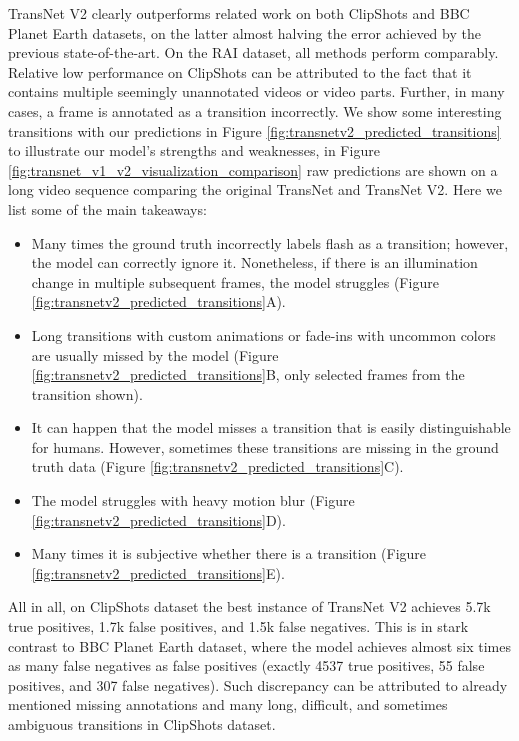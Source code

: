 TransNet V2 clearly outperforms related work on both ClipShots and BBC Planet Earth datasets, on the latter almost halving the error achieved by the previous state-of-the-art. On the RAI dataset, all methods perform comparably. Relative low performance on ClipShots can be attributed to the fact that it contains multiple seemingly unannotated videos or video parts. Further, in many cases, a frame is annotated as a transition incorrectly. We show some interesting transitions with our predictions in Figure \ref{fig:transnetv2_predicted_transitions} to illustrate our model's strengths and weaknesses, in Figure \ref{fig:transnet_v1_v2_visualization_comparison} raw predictions are shown on a long video sequence comparing the original TransNet and TransNet V2. Here we list some of the main takeaways:
\begin{itemize}
    \item Many times the ground truth incorrectly labels flash as a transition; however, the model can correctly ignore it. Nonetheless, if there is an illumination change in multiple subsequent frames, the model struggles (Figure \ref{fig:transnetv2_predicted_transitions}A).
    \item Long transitions with custom animations or fade-ins with uncommon colors are usually missed by the model (Figure \ref{fig:transnetv2_predicted_transitions}B, only selected frames from the transition shown).
    \item It can happen that the model misses a transition that is easily distinguishable for humans. However, sometimes these transitions are missing in the ground truth data (Figure \ref{fig:transnetv2_predicted_transitions}C).
    \item The model struggles with heavy motion blur (Figure \ref{fig:transnetv2_predicted_transitions}D).
    \item Many times it is subjective whether there is a transition (Figure \ref{fig:transnetv2_predicted_transitions}E).
\end{itemize}
All in all, on ClipShots dataset the best instance of TransNet V2 achieves 5.7k true positives, 1.7k false positives, and 1.5k false negatives. This is in stark contrast to BBC Planet Earth dataset, where the model achieves almost six times as many false negatives as false positives (exactly 4537 true positives, 55 false positives, and 307 false negatives). Such discrepancy can be attributed to already mentioned missing annotations and many long, difficult, and sometimes ambiguous transitions in ClipShots dataset.

